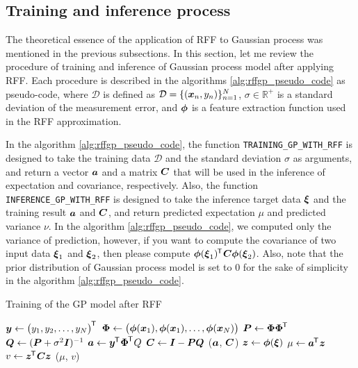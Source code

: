 \documentclass[twocolumn,a4paper,10pt]{article}
\begin{document}
\subsection{Training and inference process}

The theoretical essence of the application of RFF to Gaussian process was 
mentioned in the previous subsections. In this section, let me review the procedure of
training and inference of Gaussian process model after applying RFF. Each procedure is
described in the algorithms \ref{alg:rffgp_pseudo_code} as pseudo-code,
where $\mathcal{D}$ is defined as $\mathcal{D} = \{(\boldsymbol{x}_n, y_n)\}_{n=1}^{N}$,
$\sigma \in \mathbb{R}^+$ is a standard deviation of the measurement error,
and $\boldsymbol{\phi}$ is a feature extraction function used in the RFF approximation.

In the algorithm \ref{alg:rffgp_pseudo_code}, the function \texttt{TRAINING\_GP\_WITH\_RFF} is
designed to take the training data $\mathcal{D}$ and the standard deviation $\sigma$ as arguments,
and return a vector $\boldsymbol{a}$ and a matrix $\boldsymbol{C}$ that will be used in the inference of 
expectation and covariance, respectively. Also, the function \texttt{INFERENCE\_GP\_WITH\_RFF} is
designed to take the inference target data $\boldsymbol{\xi}$ and the training result $\boldsymbol{a}$ and $\boldsymbol{C}$,
and return predicted expectation $\mu$ and predicted variance $\nu$.
In the algorithm \ref{alg:rffgp_pseudo_code}, we computed only the variance of prediction,
however, if you want to compute the covariance of two input data $\boldsymbol{\xi}_1$ and $\boldsymbol{\xi}_2$,
then please compute $\boldsymbol{\phi}(\boldsymbol{\xi}_1)^{\mkern-1.5mu\mathsf{T}}\hspace{0.5pt} \boldsymbol{C} \boldsymbol{\phi}(\boldsymbol{\xi}_2)$.
Also, note that the prior distribution of Gaussian process model is set to 0 for the sake of
simplicity in the algorithm \ref{alg:rffgp_pseudo_code}.

\begin{algorithm}[h]
    \caption{Training of the GP model after RFF}
    \label{alg:rffgp_pseudo_code}
    \begin{algorithmic}[1]
        \State $\boldsymbol{y} \gets \bigl( y_1, y_2, \ldots, y_N \bigr)^{\mkern-1.5mu\mathsf{T}}\hspace{0.5pt}$
        \State $\boldsymbol{\Phi} \gets \bigl( \boldsymbol{\phi}(\boldsymbol{x}_1), \boldsymbol{\phi}(\boldsymbol{x}_1), \ldots, \boldsymbol{\phi}(\boldsymbol{x}_N) \bigr)$
        \State $\boldsymbol{P} \gets \boldsymbol{\Phi \Phi}^{\mkern-1.5mu\mathsf{T}}\hspace{0.5pt}$
        \State $\boldsymbol{Q} \gets (\boldsymbol{P} + \sigma^2 \boldsymbol{I})^{-1}$
        \State $\boldsymbol{a} \gets \boldsymbol{y}^{\mkern-1.5mu\mathsf{T}}\hspace{0.5pt} \boldsymbol{\Phi}^{\mkern-1.5mu\mathsf{T}}\hspace{0.5pt} Q$
        \State $\boldsymbol{C} \gets \boldsymbol{I} - \boldsymbol{PQ}$
        \State \Return ($\boldsymbol{a}$, $\boldsymbol{C}$)
    \EndFunction
    \State
        \State $\boldsymbol{z} \gets \boldsymbol{\phi}(\boldsymbol{\xi})$
        \State $\mu \gets \boldsymbol{a}^{\mkern-1.5mu\mathsf{T}}\hspace{0.5pt} \boldsymbol{z}$
        \State $v \gets \boldsymbol{z}^{\mkern-1.5mu\mathsf{T}}\hspace{0.5pt} \boldsymbol{C} \boldsymbol{z}$
        \State \Return ($\mu$, $v$)
    \EndFunction
    \end{algorithmic}
\end{algorithm}
\end{document}
